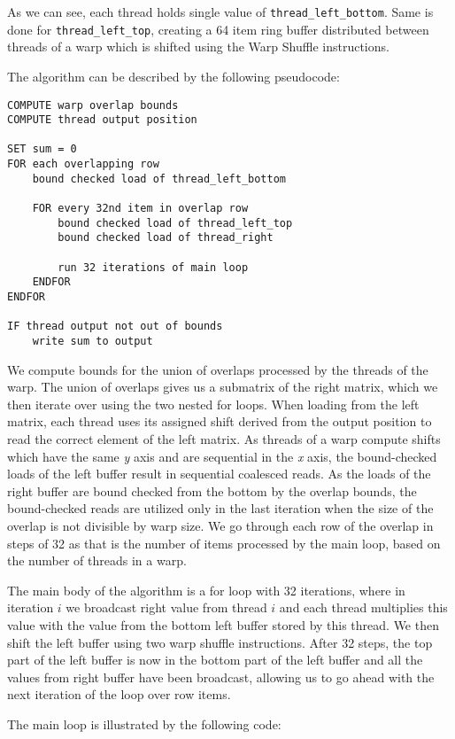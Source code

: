 As we can see, each thread holds single value of \texttt{thread\_left\_bottom}. Same is done for \texttt{thread\_left\_top}, creating a 64 item ring buffer distributed between threads of a warp which is shifted using the Warp Shuffle instructions.

The algorithm can be described by the following pseudocode:

\begin{lstlisting}[]
COMPUTE warp overlap bounds
COMPUTE thread output position

SET sum = 0
FOR each overlapping row
	bound checked load of thread_left_bottom

	FOR every 32nd item in overlap row
		bound checked load of thread_left_top
		bound checked load of thread_right

		run 32 iterations of main loop
	ENDFOR
ENDFOR

IF thread output not out of bounds
	write sum to output
\end{lstlisting}

We compute bounds for the union of overlaps processed by the threads of the warp. The union of overlaps gives us a submatrix of the right matrix, which we then iterate over using the two nested for loops. When loading from the left matrix, each thread uses its assigned shift derived from the output position to read the correct element of the left matrix. As threads of a warp compute shifts which have the same \textit{y} axis and are sequential in the \textit{x} axis, the bound-checked loads of the left buffer result in sequential coalesced reads. As the loads of the right buffer are bound checked from the bottom by the overlap bounds, the bound-checked reads are utilized only in the last iteration when the size of the overlap is not divisible by warp size. We go through each row of the overlap in steps of 32 as that is the number of items processed by the main loop, based on the number of threads in a warp.


The main body of the algorithm is a for loop with 32 iterations, where in iteration $i$ we broadcast right value from thread $i$ and each thread multiplies this value with the value from the bottom left buffer stored by this thread. We then shift the left buffer using two warp shuffle instructions. After 32 steps, the top part of the left buffer is now in the bottom part of the left buffer and all the values from right buffer have been broadcast, allowing us to go ahead with the next iteration of the loop over row items.

The main loop is illustrated by the following code:

